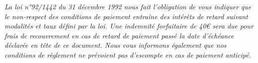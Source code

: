 \documentclass[11pt,a4paper]{article}
\begin{document}
\vspace{0.5cm}
\textit{\footnotesize La loi n°92/1442 du 31 décembre 1992 nous fait l'obligation de vous indiquer que le non-respect des conditions de paiement entraîne des intérêts de retard suivant modalités et taux défini par la loi. Une indemnité forfaitaire de 40€ sera due pour frais de recouvrement en cas de retard de paiement passé la date d'échéance déclarée en tête de ce document. Nous vous informons également que nos conditions de règlement ne prévoient pas d'escompte en cas de paiement anticipé.}
\end{document}
